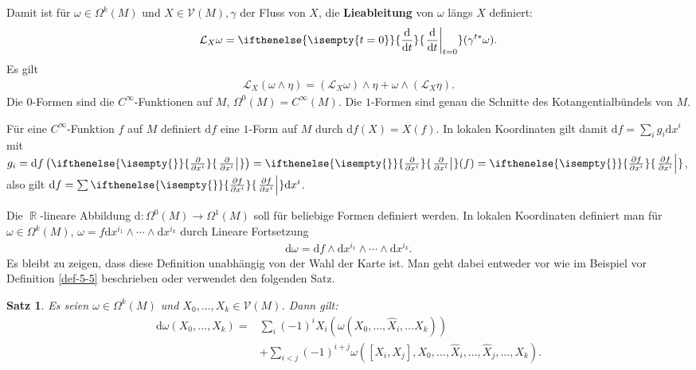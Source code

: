 \documentclass[paper=A4, twoside, chapterprefix=true, bibliography=totoc, headsepline]{scrbook}
\DeclareMathOperator{\R}{\mathbb{R}}
\newcommand{\dop}{\mathrm{d}}
\newcommand{\difffrac}[3][]{\ifthenelse{\isempty{#1}}{\frac{\dop #2}{\dop #3}}{\left. \frac{\dop #2}{\dop #3} \right|_{#1}}}
\newcommand{\pdifffrac}[3][]{\ifthenelse{\isempty{#1}}{\frac{\partial #2}{\partial #3}}{\left. \frac{\partial #2}{\partial #3} \right|_{#1}}}
\theoremstyle{plain}
\newtheorem{Satz}[Dfn]{Satz}
\theoremstyle{nonumberplain}
\theoremstyle{empty}
\theoremstyle{break}
\newcommand{\CmIndex}[2][]{\ifthenelse{\isempty{#1}}{\index{#2}}{\index{#1}}#2}
\newcommand{\CmMark}[2][]{\textbf{\CmIndex[#1]{#2}}}
\begin{document}
Damit ist f\"ur $\omega \in \Omega^k(M)$ und $X \in \mathcal V(M), \gamma $ der Fluss von $X$, die \CmMark{Lieableitung} von $\omega$ l\"angs $X$ definiert:
\begin{align*}
	\mathcal L_X\omega = \difffrac[t=0]{}{t}(\gamma^{t*}\omega).
\end{align*}
Es gilt 
\begin{align*}
	\mathcal L_X(\omega \wedge \eta) = (\mathcal L_X\omega) \wedge \eta + \omega \wedge (\mathcal L_X\eta).
\end{align*}
Die $0$-Formen sind die $C^{\infty}$-Funktionen auf $M$, $\Omega^0(M) = C^{\infty}(M)$. Die $1$-Formen sind genau die Schnitte des Kotangentialb\"undels von $M$.

F\"ur eine $C^{\infty}$-Funktion $f$ auf $M$ definiert $\dop f$ eine $1$-Form auf $M$ durch $\dop f (X) = X(f)$.
In lokalen Koordinaten gilt damit $\dop f = \sum_ig_i\dop x^i$ mit $g_i = \dop f\left(\pdifffrac{}{x^i}\right) = \pdifffrac{}{x^i}(f) = \pdifffrac{f}{x^i}$, also gilt $\dop f = \sum \pdifffrac{f}{x^i}\dop x^i$.

Die $\R$-lineare Abbildung $\dop \colon \Omega^0(M) \to \Omega^1(M)$ soll f\"ur beliebige Formen definiert werden.
In lokalen Koordinaten definiert man f\"ur $\omega \in \Omega^k(M)$, $\omega = f \dop x^{i_1} \wedge \cdots \wedge \dop x^{i_k}$ durch Lineare Fortsetzung
\begin{align*}
	\dop \omega = \dop f \wedge \dop x^{i_1} \wedge \cdots \wedge \dop x^{i_k}.
\end{align*}
Es bleibt zu zeigen, dass diese Definition unabh\"angig von der Wahl der Karte ist. Man geht dabei entweder vor wie im Beispiel vor Definition \ref{def-5-5} beschrieben oder verwendet den folgenden Satz.

\begin{Satz}
  Es seien $\omega \in \Omega^k(M)$ und $X_0, \ldots, X_k \in \mathcal V(M)$.
  Dann gilt:
  \begin{align*}
    \dop \omega(X_0, \ldots, X_k) ={} & \sum_i(-1)^iX_i(\omega(X_0, \ldots, \hat X_i, \ldots X_k)) \\
    & + \sum_{i<j}(-1)^{i+j}\omega([X_i,X_j], X_0, \ldots, \hat X_i, \ldots, \hat X_j, \ldots, X_k).
  \end{align*}
\end{Satz}
\end{document}
